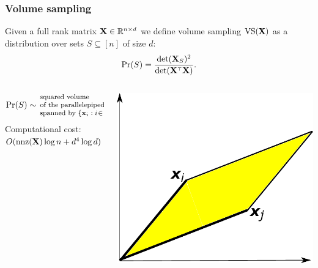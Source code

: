 \documentclass{beamer}
\begin{document}
\begin{frame}
\frametitle{Volume sampling}
  \begin{definition}
  Given a  full rank matrix  $\mathbf X\in\mathbb R^{n\times d}$ we define volume sampling
  ${\mathrm{VS}}(\mathbf X)$ as a distribution over sets $S\subseteq [n]$ of size $d$:
  \vspace{-1mm}
  \begin{align*}
    \Pr(S) =
    \frac{\det(\X_S)^2}{\det(\X^\top\X)}.
  \end{align*}
\end{definition}\pause
\begin{columns}
  \begin{column}{0.59\textwidth}
$$
\mathrm{Pr}(S)\sim \!\!{\footnotesize
\begin{array}{l}
  \text{squared volume}\\
  \text{of the parallelepiped} \\
\text{spanned by $\{\mathbf x_i:i\!\in\! S\}$}
\end{array}
}
$$
{\footnotesize Computational cost: $O(\mathrm{nnz}(\mathbf X)\log n+d^4\log d)$}
\end{column}
\begin{column}{.35\textwidth}
\includegraphics[width=\textwidth]{../talk/figs/volume_simple}
\end{column}
\end{columns}
\end{frame}
\end{document}
